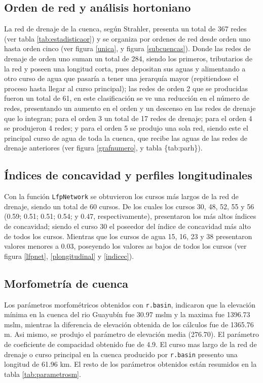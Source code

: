 \documentclass[11pt,]{article}
\begin{document}
\subsection{Orden de red y análisis
hortoniano}\label{orden-de-red-y-anuxe1lisis-hortoniano}

La red de drenaje de la cuenca, según Strahler, presenta un total de 367
redes (ver tabla \ref{tab:estadisticaor}) y se organiza por ordenes de
red desde orden uno hasta orden cinco (ver figura \ref{unica}, y figura
\ref{subcuencas}). Donde las redes de drenaje de orden uno suman un
total de 284, siendo los primeros, tributarios de la red y poseen una
longitud corta, pues depositan sus aguas y alimentando a otro curso de
agua que pasaría a tener una jerarquía mayor (repitiendose el proceso
hasta llegar al curso principal); las redes de orden 2 que se producidas
fueron un total de 61, en este clasificación se ve una reducción en el
número de redes, presentando un aumento en el orden y un descenso en las
redes de drenaje que lo integran; para el orden 3 un total de 17 redes
de drenaje; para el orden 4 se produjeron 4 redes; y para el orden 5 se
produjo una sola red, siendo este el principal curso de agua de toda la
cuenca, que recibe las aguas de las redes de drenaje anteriores (ver
figura \ref{grafnumero}, y tabla \{tab:parh\}).

\subsection{Índices de concavidad y perfiles
longitudinales}\label{uxedndices-de-concavidad-y-perfiles-longitudinales}

Con la función \texttt{LfpNetwork} se obtuvieron los cursos más largos
de la red de drenaje, siendo un total de 60 cursos. De los cuales los
cursos 30, 48, 52, 55 y 56 (0.59; 0.51; 0.51; 0.54; y 0.47,
respectivamente), presentaron los más altos índices de concavidad;
siendo el curso 30 el poseedor del índice de concavidad más alto de
todos los cursos. Mientras que los cursos de agua 15, 16, 23 y 38
presentaron valores menores a 0.03, poseyendo los valores as bajos de
todos los cursos (ver figura \ref{lfpnet}, \ref{plongitudinal} y
\ref{indicec}).

\subsection{Morfometría de cuenca}\label{morfometruxeda-de-cuenca}

Los parámetros morfométricos obtenidos con \texttt{r.basin}, indicaron
que la elevación mínima en la cuenca del rio Guayubín fue 30.97 mslm y
la maxima fue 1396.73 mslm, mientras la diferencia de elevación obtenida
de los cálculos fue de 1365.76 m. Asi mismo, se produjo el parámetro de
elevación media (276.70). El parámetro de coeficiente de compacidad
obtenido fue de 4.9. El curso mas largo de la red de drenaje o curso
principal en la cuenca producido por \texttt{r.basin} presento una
longitud de 61.96 km. El resto de los parámetros obtenidos están
resumidos en la tabla \ref{tab:parametrosm}.
\end{document}
